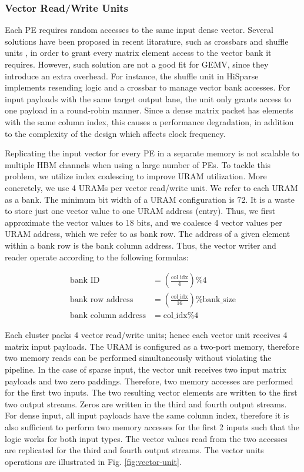 \documentclass[manuscript,screen,review]{acmart}
\begin{document}
\subsubsection{Vector Read/Write Units}
Each PE requires random accesses to the same input dense vector. Several solutions have been proposed in recent litarature, such as crossbars and shuffle units \cite{hisparse,fccm-spmv}, in order to grant every matrix element access to the vector bank it requires. However, such solution are not a good fit for GEMV, since they introduce an extra overhead. For instance, the shuffle unit in HiSparse \cite{hisparse} implements resending logic and a crossbar to manage vector bank accesses. For input payloads with the same target output lane, the unit only grants access to one payload in a round-robin manner. Since a dense matrix packet has elements with the same column index, this causes a performance degradation, in addition to the complexity of the design which affects clock frequency.

Replicating the input vector for every PE in a separate memory is not scalable to
multiple HBM channels when using a large number of PEs. To tackle this problem, we utilize index coalescing to improve URAM utilization. More concretely, we use 4 URAMs per vector read/write unit. We refer to each URAM as a bank. The minimum bit width of a URAM configuration is 72. It is a waste to store just one vector value to one URAM address (entry). Thus, we first approximate the vector values to 18 bits, and we coalesce 4 vector values per URAM address, which we refer to as bank row. The address of a given element within a bank row is the bank column address. Thus, the vector writer and reader operate according to the following formulas:

\begin{align}
	\text{bank ID} &= \left(\frac{\text{col\_idx}}{4}\right) \% 4 \\
	\text{bank row address} &= \left(\frac{\text{col\_idx}}{16}\right) \% \text{bank\_size} \\
	\text{bank column address} &= \text{col\_idx} \% 4
\end{align}

Each cluster packs 4 vector read/write units; hence each vector unit receives 4 matrix input payloads. The URAM is configured as a two-port memory, therefore two memory reads can be performed simultaneously without violating the pipeline. In the case of sparse input, the vector unit receives two input matrix payloads and two zero paddings. Therefore, two memory accesses are performed for the first two inputs. The two resulting vector elements are written to the first two output streams. Zeros are written in the third and fourth output streams. For dense input, all input payloads have the same column index, therefore it is also sufficient to perform two memory accesses for the first 2 inputs such that the logic works for both input types. The vector values read from the two accesses are replicated for the third and fourth output streams. The vector units operations are illustrated in Fig. \ref{fig:vector-unit}.
\end{document}
